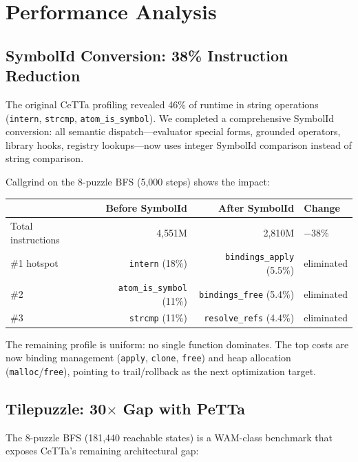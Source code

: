 \documentclass[11pt]{article}
\newcommand{\code}[1]{\texttt{#1}}
\newcommand{\CeTTa}{\textup{CeTTa}}
\begin{document}
\section{Performance Analysis}

\subsection{SymbolId Conversion: 38\% Instruction Reduction}

The original \CeTTa{} profiling revealed 46\% of runtime in string
operations (\code{intern}, \code{strcmp}, \code{atom\_is\_symbol}).
We completed a comprehensive SymbolId conversion: all semantic
dispatch---evaluator special forms, grounded operators, library hooks,
registry lookups---now uses integer SymbolId comparison instead of
string comparison.

Callgrind on the 8-puzzle BFS (5{,}000 steps) shows the impact:

\begin{center}
\begin{tabular}{lrrl}
\toprule
& Before SymbolId & After SymbolId & Change \\
\midrule
Total instructions & 4{,}551M & 2{,}810M & $-$38\% \\
\#1 hotspot & \code{intern} (18\%) & \code{bindings\_apply} (5.5\%) & eliminated \\
\#2 & \code{atom\_is\_symbol} (11\%) & \code{bindings\_free} (5.4\%) & eliminated \\
\#3 & \code{strcmp} (11\%) & \code{resolve\_refs} (4.4\%) & eliminated \\
\bottomrule
\end{tabular}
\end{center}

The remaining profile is uniform: no single function dominates.
The top costs are now binding management (\code{apply}, \code{clone},
\code{free}) and heap allocation (\code{malloc}/\code{free}), pointing
to trail/rollback as the next optimization target.

\subsection{Tilepuzzle: 30$\times$ Gap with PeTTa}

The 8-puzzle BFS (181{,}440 reachable states) is a WAM-class benchmark
that exposes \CeTTa{}'s remaining architectural gap:
\end{document}
